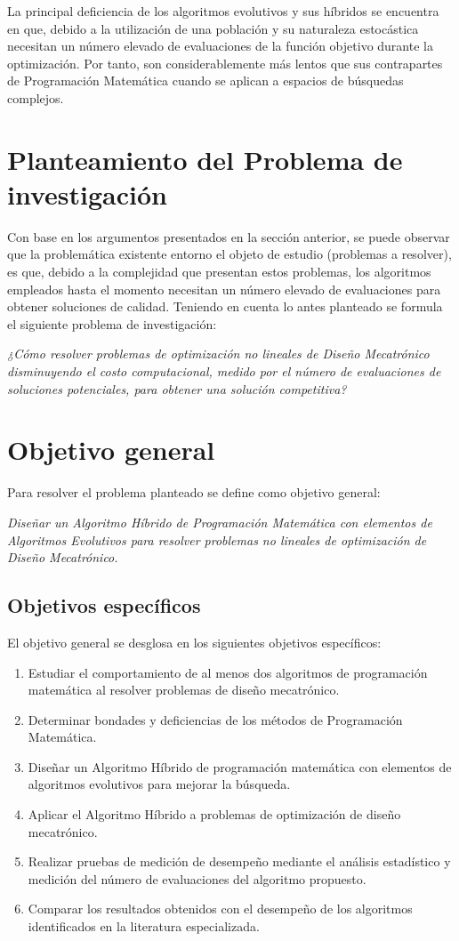 La principal deficiencia de los algoritmos evolutivos y sus híbridos se encuentra en que, debido a la utilización de una población y su naturaleza estocástica necesitan un número elevado de evaluaciones de la función objetivo durante la optimización. Por tanto, son considerablemente más lentos que sus contrapartes de Programación Matemática cuando se aplican a espacios de búsquedas complejos. 
\section{Planteamiento del Problema de investigación}
  
Con base en los argumentos presentados en la sección anterior, se puede observar que la problemática existente entorno el objeto de estudio (problemas a resolver), es que, debido a la complejidad que presentan estos problemas, los algoritmos empleados hasta el momento necesitan un número elevado de evaluaciones para obtener soluciones de calidad. Teniendo en cuenta lo antes planteado se formula el siguiente problema de investigación:

  \textit{¿Cómo resolver problemas de optimización no lineales de Diseño Mecatrónico disminuyendo el costo computacional, medido por el número de evaluaciones de soluciones potenciales, para obtener una solución competitiva?}
  \section{Objetivo general}
  Para resolver el problema planteado se define como objetivo general:
  
  
 \textit{ Diseñar un Algoritmo Híbrido de Programación Matemática con elementos de Algoritmos Evolutivos  para resolver problemas no lineales de optimización de  Diseño Mecatrónico.} 
  \subsection{Objetivos específicos}
  El objetivo general se desglosa en los siguientes objetivos específicos:
  \begin{enumerate}
  	\item	Estudiar el comportamiento de al menos dos algoritmos de programación matemática al resolver problemas de diseño mecatrónico.
  	\item	Determinar bondades y deficiencias de los métodos de Programación Matemática.
  	\item	Diseñar un Algoritmo Híbrido de programación matemática con elementos de algoritmos evolutivos para mejorar la búsqueda.
  	\item	Aplicar el Algoritmo Híbrido a problemas de optimización de diseño mecatrónico.
  	\item	Realizar pruebas de medición de desempeño mediante el análisis estadístico y medición del número de evaluaciones del algoritmo propuesto.
  	\item	Comparar los resultados obtenidos con el desempeño de los algoritmos identificados en la literatura especializada.
  \end{enumerate}
  
